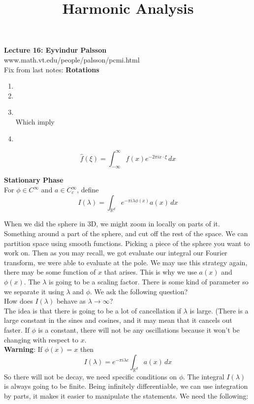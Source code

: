 \documentclass[12pt]{article}
\title{Harmonic Analysis}
\begin{document}
\noindent \textbf{Lecture 16: Eyvindur Palsson} \\
\noindent www.math.vt.edu/people/palsson/pcmi.html \\

\noindent Fix from last notes:
\noindent \textbf{Rotations} \\
\begin{enumerate}[itemsep=0pt, parsep=0pt, topsep=0pt, partopsep=0pt, label=(\alph*)]
\item 
\item 
\item  \textcolor{white}{1} \\
Which imply
\item 
\end{enumerate}

$$\hat{f}(\xi) = \int^\infty_{-\infty} f(x) e^{-2\pi i x \cdot \xi} \, dx$$

\hrulefill

\noindent \textbf{Stationary Phase} \\
\noindent For $\phi \in C^\infty$ and $a \in C^\infty_c$, define
$$I(\lambda) = \int_{\mathbb{R}^d} e^{-\pi i \lambda \phi(x)}a(x) \,dx$$

When we did the sphere in 3D, we might zoom in locally on parts of it. Something around a part of the sphere, and cut off the rest of the space. We can partition space using smooth functions. Picking a piece of the sphere you want to work on. Then as you may recall, we got evaluate our integral our Fourier transform, we were able to evaluate at the pole. We may use this strategy again, there may be some function of $x$ that arises. This is why we use $a(x)$ and $\phi(x)$. The $\lambda$ is going to be a scaling factor. There is some kind of parameter so we separate it using $\lambda$ and $\phi$. We ask the following question? \\

\noindent How does $I(\lambda)$ behave as $\lambda \rightarrow \infty$? \\ 
\noindent The idea is that there is going to be a lot of cancellation if $\lambda$ is large. (There is a large constant in the sines and cosines, and it may mean that it cancels out faster. If $\phi$ is a constant, there will not be any oscillations because it won't be changing with respect to $x$. \\

\noindent \textbf{Warning}: If $\phi(x) =x$ then 
$$I(\lambda) = e^{-\pi i \lambda c} \int_{\mathbb{R}^d} a(x) \,dx$$
So there will not be decay, we need specific conditions on $\phi$. The integral $I(\lambda)$ is always going to be finite. Being infinitely differentiable, we can use integration by parts, it makes it easier to manipulate the statements. We need the following: \\
\end{document}
